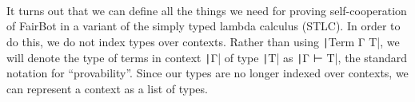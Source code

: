\begin{code}
\\
\>[2]\<[4]%
\>[4] \AgdaSymbol{((} \AgdaSymbol{:}   \AgdaSymbol{)}   \AgdaSymbol{)}\<%
\\
\>[2]\<[4]%
\>[4] \AgdaSymbol{(} \AgdaSymbol{:} \AgdaSymbol{)} \AgdaSymbol{(} \AgdaSymbol{:}  \AgdaSymbol{)}   \AgdaSymbol{(} \AgdaInductiveConstructor{,} \AgdaSymbol{)}\<%
\\
\>\AgdaFunction{\textasciicircum}    \AgdaSymbol{=}  \AgdaSymbol{(} \AgdaInductiveConstructor{,} \AgdaSymbol{)}\<%
\end{code}

It turns out that we can define all the things we need for proving
self-cooperation of FairBot in a variant of the simply typed lambda
calculus (STLC).  In order to do this, we do not index types over
contexts.  Rather than using \texttt|Term {Γ} T|, we will
denote the type of terms in context \texttt|Γ| of type
\texttt|T| as \texttt|Γ ⊢ T|, the standard
notation for ``provability''.  Since our types are no longer indexed
over contexts, we can represent a context as a list of types.

\begin{code}%
\>   \<%
\\
\>   \<%
\\
%
\\
\>  \AgdaSymbol{:}  \<%
\\
\>[0]\<[2]%
\>[2] \AgdaSymbol{:}      \<%
\\
\>[0]\<[2]%
\>[2]  \AgdaSymbol{:}     \<%
\\
\>[0]\<[2]%
\>[2]  \AgdaSymbol{:} \<%
\\
%
\\
\> \AgdaSymbol{=}  \<%
\end{code}

